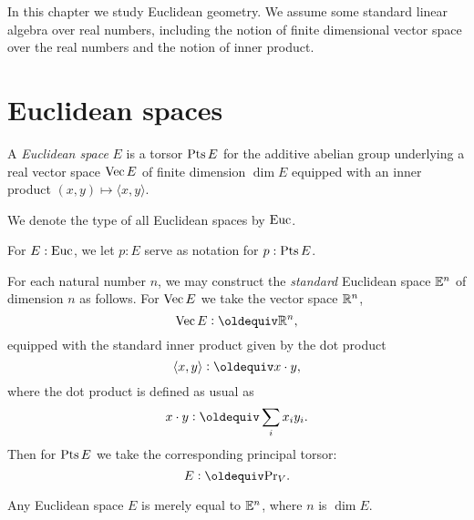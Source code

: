 

In this chapter we study Euclidean geometry.  We assume some standard linear
algebra over real numbers, including the notion of finite dimensional vector
space over the real numbers and the notion of inner product.

\section{Euclidean spaces}

\begin{definition}\label{def:EuclideanSpace}
  A {\em Euclidean space} $E$ is a torsor $\operatorname{Pts} E$ for the additive abelian group underlying
  a real vector space $\operatorname{Vec} E$ of finite dimension $\dim E$ equipped with an inner product
  $(x,y) \mapsto \langle x,y \rangle$.
\end{definition}

We denote the type of all Euclidean spaces by $\mathrm{Euc}$.

For $E:\mathrm{Euc}$, we let $p:E$ serve as notation for $p:\operatorname{Pts} E$.

For each natural number $n$, we may construct the {\em standard} Euclidean
space $\mathbb E^n$ of dimension $n$ as follows.  For $\operatorname{Vec} E$ we take the vector space $\mathbb{R}^n$,
$$ \Vectors E \defeq \RR^n, $$
equipped with the standard inner product given by the dot product
$$ \langle x , y \rangle \defeq x \cdot y, $$
where the dot product is defined as usual as
$$ x \cdot y \defeq \sum_i x_i y_i . $$
Then for $\operatorname{Pts} E$ we take the corresponding principal torsor:
$$ E \defeq \princ V. $$

\begin{theorem}\label{thm:GramSchmidt}
  Any Euclidean space $E$ is merely equal to $\mathbb E^n$, where $n$ is $\dim E$.
\end{theorem}

